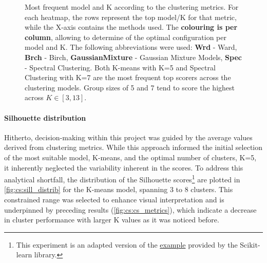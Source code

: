 \begin{figure}[!t]
    \caption[Heatmaps: most common cluster model and $K$]{Most frequent model and K according to the clustering metrics. For each heatmap, the rows represent the top model/K for that metric, while the X-axis contains the methods used. The \textbf{colouring is per column}, allowing to determine of the optimal configuration per model and K. The following abbreviations were used: \textbf{Wrd} - Ward, \textbf{Brch} - Birch, \textbf{GaussianMixture} - Gaussian Mixture Models, \textbf{Spec} - Spectral Clustering. Both K-means with K=5 and Spectral Clustering with K=7 are the most frequent top scorers across the clustering models. Group sizes of 5 and 7 tend to score the highest across $K\in[3,13]$.}
    \label{fig:cs:cs_metrics_heatmap}
\end{figure}



\paragraph*{Silhouette distribution}

Hitherto, decision-making within this project was guided by the average values derived from clustering metrics. While this approach informed the initial selection of the most suitable model, K-means, and the optimal number of clusters, K=5, it inherently neglected the variability inherent in the scores. To address this analytical shortfall, the distribution of the Silhouette scores\footnote{This experiment is an adapted version of the \href{https://tinyurl.com/sillhouete-distrib}{example} provided by the Scikit-learn library.} are plotted in \cref{fig:cs:sill_distrib} for the K-means model, spanning 3 to 8 clusters. This constrained range was selected to enhance visual interpretation and is underpinned by preceding results (\cref{fig:cs:cs_metrics}), which indicate a decrease in cluster performance with larger K values as it was noticed before.


